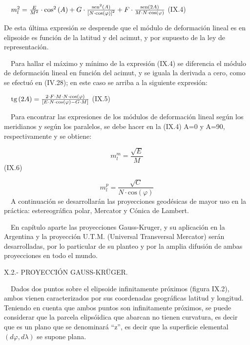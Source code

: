 \documentclass{tufte-book}
\newcommand\normalsubformula[1]{\text{\mathversion{normal}$#1$}}
\begin{document}
\ \  ${m_{{l}}^{{2}}=\frac{E}{M^{{2}}}\cdot
\text{cos}^{{2}}\left(A\right)+G\cdot
{\frac{\normalsubformula{\text{sen}}^{{2}}\left(A\right)}{\left[N\cdot
\text{cos}\left(\varphi \right)\right]^{{2}}}}+F\cdot
{\frac{\normalsubformula{\text{sen}}\left(2A\right)}{M\cdot N\cdot
\text{cos}\left(\varphi \right)}}}$  (IX.4)

De esta última expresión se desprende que el módulo de
deformación lineal es en elipsoide es función de la latitud y del
acimut, y por supuesto de la ley de representación.

\ \ Para hallar el máximo y mínimo de la expresión (IX.4) se
diferencia el módulo de deformación lineal en función del acimut,
y se iguala la derivada a cero, como se efectuó en (IV.28); en este
caso se arriba a la siguiente expresión:

\ \  ${\normalsubformula{\text{tg}}\left(2A\right)=\frac{2\cdot F\cdot
M\cdot N\cdot \text{cos}\left(\varphi \right)}{\left[E\cdot N\cdot
\text{cos}\left(\varphi \right)-G\cdot M\right]}}$  (IX.5)

\ \ Para encontrar las expresiones de los módulos de deformación
lineal según los meridianos y según los paralelos, se debe hacer en
la (IX.4) A=0 y A=90, respectivamente y se obtiene:

\begin{equation*}
{m_{{l}}^{{m}}=\frac{\sqrt{E}}{M}}
\end{equation*}
 (IX.6)

\begin{equation*}
{m_{{l}}^{{p}}=\frac{\sqrt{C}}{N\cdot \text{cos}\left(\varphi \right)}}
\end{equation*}
\ \ A continuación se desarrollarán las proyecciones geodésicas de
mayor uso en la práctica: estereográfica polar, Mercator y Cónica
de Lambert.

\ \ En capítulo aparte las proyecciones Gauss-Kruger, y su
aplicación en la Argentina y la proyección U.T.M. (Universal
Transversal Mercator) serán desarrolladas, por lo particular de su
planteo y por la amplia difusión de ambas proyecciones en todo el
mundo.

X.2.- PROYECCIÓN GAUSS-KR\"UGER.

\ \ Dados dos puntos sobre el elipsoide infinitamente próximos (figura
IX.2), ambos vienen caracterizados por sus coordenadas geográficas
latitud y longitud. Teniendo en cuenta que ambos puntos son
infinitamente próximos, se puede considerar que la parcela
elipsóidica que abarcan no tienen curvatura, es decir que es un plano
que se denominará {\textquotedblleft}z{\textquotedblright}, es decir
que la superficie elemental  ${\left(\mathit{d\varphi
},\mathit{d\lambda }\right)}$ se supone plana.
\end{document}
